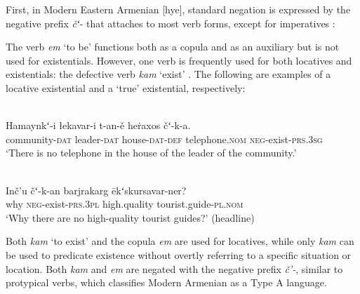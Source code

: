 ﻿\documentclass[output=paper]{langsci/langscibook}
\begin{document}
First, in Modern Eastern Armenian [hye], standard negation is
expressed by the negative prefix \textit{čʻ}- that attaches to most verb
forms, except for imperatives \parencite[522]{DumTragut2009}:
%
    \begin{exe}\end{exe}
%
The verb \textit{em} `to be' functions both as a copula and as an auxiliary
\parencite[215]{DumTragut2009} but is not used for existentials. However,
one verb is frequently used for both locatives and existentials: the
defective verb \textit{kam} `exist' \parencite[282]{DumTragut2009}. The following are examples of a locative existential and a `true' existential, respectively:
%
\begin{exe}
\ex
{}\\
    \gll Hamaynkʻ-i łekavar-i t-an-ě heṙaxos čʻ-k-a.  \\
community-\textsc{dat} leader-\textsc{dat} house-\textsc{dat-def}
telephone.\textsc{nom} \textsc{neg}-exist-\textsc{prs.3sg} \\
\glt `There is no telephone in the house of the leader of the community.' 

\ex
{}\\
    \gll Inč’u čʻ-k-an barjrakarg ēkʻskursavar-ner?  \\
why \textsc{neg}-exist-\textsc{prs.3pl} high.quality
tourist.guide-\textsc{pl.nom} \\
    \glt `Why there are no high-quality tourist guides?' (headline)
    \end{exe}
%
Both \textit{kam} `to exist' and the copula \textit{em} are used for locatives, while only \textit{kam} can be used to predicate existence without overtly referring to a specific situation or location. Both \textit{kam} and \textit{em} are negated with the negative prefix \textit{č’-}, similar to protypical verbs, which classifies Modern Armenian as a Type A language. 
\end{document}
